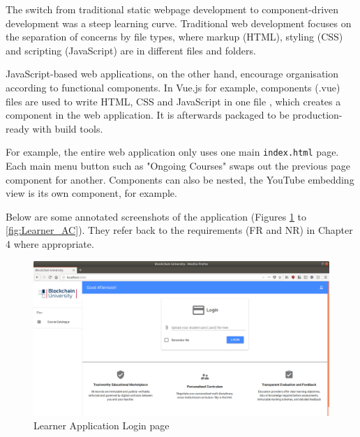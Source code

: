 The switch from traditional static webpage development to component-driven development was a steep learning curve.
Traditional web development focuses on the separation of concerns by file types, where markup (HTML), 
styling (CSS) and scripting (JavaScript) are in different files and folders.

JavaScript-based web applications, on the other hand, encourage organisation according to functional components. 
In Vue.js for example, components (.vue) files are used to write HTML, CSS and JavaScript in one file \citep{vue2017components}, 
which creates a component in the web application. It is afterwards packaged to be production-ready with build tools.

For example, the entire web application only uses one main \texttt{index.html} page. Each main menu button 
such as "Ongoing Courses" swaps out the previous page component for another. Components can also be nested, 
the YouTube embedding view is its own component, for example.

Below are some annotated screenshots of the application (Figures \ref{fig:Learner_login} to 
\ref{fig:Learner_AC}). They refer back to the requirements (FR and NR) in Chapter 4 where appropriate.

\begin{figure}[!ht]
	\centering
	\includegraphics[width=1.05\textwidth]{Learner_login}
	\caption[Learner Application Login page]
	{Learner Application Login page}
	\label{fig:Learner_login}
\end{figure}

